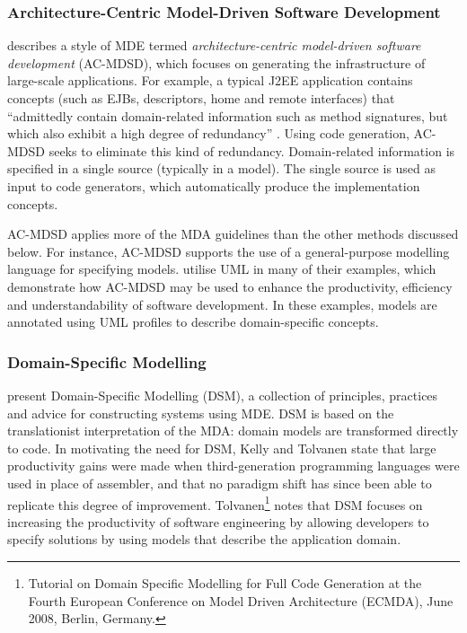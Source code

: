 \subsubsection{Architecture-Centric Model-Driven Software Development}
\cite{stahl06mdsd} describes a style of MDE termed \textit{architecture-centric model-driven software development} (AC-MDSD), which focuses on generating the infrastructure of large-scale applications. For example, a typical J2EE application contains concepts (such as EJBs, descriptors, home and remote interfaces) that ``admittedly contain domain-related information such as method signatures, but which also exhibit a high degree of redundancy'' \cite{stahl06mdsd}. Using code generation, AC-MDSD seeks to eliminate this kind of redundancy. Domain-related information is specified in a single source (typically in a model). The single source is used as input to code generators, which automatically produce the implementation concepts.

AC-MDSD applies more of the MDA guidelines than the other methods discussed below. For instance, AC-MDSD supports the use of a general-purpose modelling language for specifying models. \cite{stahl06mdsd} utilise UML in many of their examples, which demonstrate how AC-MDSD may be used to enhance the productivity, efficiency and understandability of software development. In these examples, models are annotated using UML profiles to describe domain-specific concepts.


\subsubsection{Domain-Specific Modelling}
\cite{kelly08dsm} present Domain-Specific Modelling (DSM), a collection of principles, practices and advice for constructing systems using MDE. DSM is based on the translationist interpretation of the MDA: domain models are transformed directly to code. In motivating the need for DSM, Kelly and Tolvanen state that large productivity gains were made when third-generation programming languages were used in place of assembler, and that no paradigm shift has since been able to replicate this degree of improvement. Tolvanen\footnote{Tutorial on Domain Specific Modelling for Full Code Generation at the Fourth European Conference on Model Driven Architecture (ECMDA), June 2008, Berlin, Germany.} notes that DSM focuses on increasing the productivity of software engineering by allowing developers to specify solutions by using models that describe the application domain.

